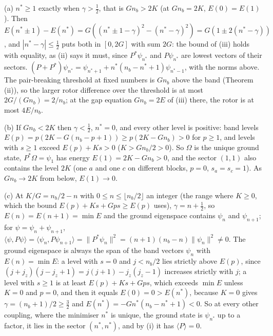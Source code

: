 (a) $n^{*} \ge 1$ exactly when $\gamma > \tfrac12$, that is $Gn_{b} > 2K$ (at $Gn_{b} = 2K$, $E(0) = E(1)$). Then $E(n^{*} \pm 1) - E(n^{*}) = G((n^{*} \pm 1 - \gamma)^{2} - (n^{*} - \gamma)^{2}) = G(1 \pm 2(n^{*} - \gamma))$, and $|n^{*} - \gamma| \le \tfrac12$ puts both in $[0, 2G]$ with sum $2G$: the bound of (iii) holds with equality, as (ii) says it must, since $P^{*}\psi_{n^{*}}$ and $P\psi_{n^{*}}$ are lowest vectors of their sectors. $(P + P^{*})\psi_{n^{*}} = \psi_{n^{*}+1} + n^{*}(n_{b} - n^{*} + 1)\psi_{n^{*}-1}$, with the norms above. The pair-breaking threshold at fixed numbers is $Gn_{b}$ above the band (Theorem (ii)), so the larger rotor difference over the threshold is at most $2G/(Gn_{b}) = 2/n_{b}$; at the gap equation $Gn_{b} = 2E$ of (iii) there, the rotor is at most $4E/n_{b}$.

(b) If $Gn_{b} < 2K$ then $\gamma < \tfrac12$, $n^{*} = 0$, and every other level is positive: band levels $E(p) = p(2K - G(n_{b} - p + 1)) \ge p(2K - Gn_{b}) > 0$ for $p \ge 1$, and levels with $s \ge 1$ exceed $E(p) + Ks > 0$ ($K > Gn_{b}/2 > 0$). So $\Omega$ is the unique ground state, $P^{*}\Omega = \psi_{1}$ has energy $E(1) = 2K - Gn_{b} > 0$, and the sector $(1, 1)$ also contains the level $2K$ (one $a$ and one $c$ on different blocks, $p = 0$, $s_{a} = s_{c} = 1$). As $Gn_{b} \to 2K$ from below, $E(1) \to 0$.

(c) At $K/G = n_{b}/2 - n$ with $0 \le n \le \lfloor n_{b}/2\rfloor$ an integer (the range where $K \ge 0$, which the bound $E(p) + Ks + Gps \ge E(p)$ uses), $\gamma = n + \tfrac12$, so $E(n) = E(n + 1) = \min E$ and the ground eigenspace contains $\psi_{n}$ and $\psi_{n+1}$; for $\psi = \psi_{n} + \psi_{n+1}$, $\langle\psi, P\psi\rangle = \langle\psi_{n}, P\psi_{n+1}\rangle = \|P^{*}\psi_{n}\|^{2} = (n + 1)(n_{b} - n)\|\psi_{n}\|^{2} \ne 0$. The ground eigenspace is always the span of the band vectors $\psi_{n}$ with $E(n) = \min E$: a level with $s = 0$ and $j < n_{b}/2$ lies strictly above $E(p)$, since $(j + j_{z})(j - j_{z} + 1) = j(j + 1) - j_{z}(j_{z} - 1)$ increases strictly with $j$; a level with $s \ge 1$ is at least $E(p) + Ks + Gps$, which exceeds $\min E$ unless $K = 0$ and $p = 0$, and then it equals $E(0) = 0 > E(n^{*})$, because $K = 0$ gives $\gamma = (n_{b} + 1)/2 \ge \tfrac32$ and $E(n^{*}) = -Gn^{*}(n_{b} - n^{*} + 1) < 0$. So at every other coupling, where the minimiser $n^{*}$ is unique, the ground state is $\psi_{n^{*}}$ up to a factor, it lies in the sector $(n^{*}, n^{*})$, and by (i) it has $\langle P\rangle = 0$.

